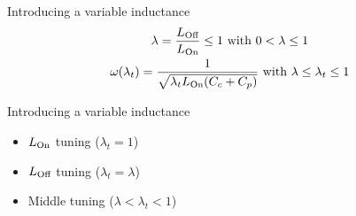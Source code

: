 \documentclass[../main.tex]{subfiles}
\begin{document}
\begin{frame}{Introducing a variable inductance}
\begin{gather*}
    \lambda = \frac{L_{\text{Off}}}{L_{\text{On}}} \leq 1\text{ with } 0 < \lambda \leq 1\\
    \omega(\lambda_{t}) = \frac{1}{\sqrt{\lambda_{t}L_{\text{On}}(C_{c} + C_{p})}}\text{ with } \lambda \leq \lambda_{t} \leq 1
\end{gather*}
\end{frame}

%

\begin{frame}{Introducing a variable inductance}
\begin{itemize}[]
    \item \(L_{\text{On}}\) tuning (\(\lambda_{t} = 1\))
    \item \(L_{\text{Off}}\) tuning (\(\lambda_{t} = \lambda\))
    \item Middle tuning (\(\lambda < \lambda_{t} < 1\))
\end{itemize}
\end{frame}
\end{document}
